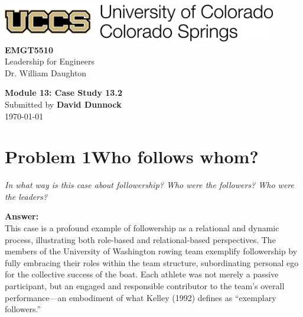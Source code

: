 \documentclass[12pt]{article}
\newenvironment{problem}{\color{dodblue}\itshape}{\par}
\begin{document}
\begin{center}
    \includegraphics[width=0.9\textwidth,keepaspectratio]{assets/images/uccs-logo.png}\\[8\baselineskip]

    {\HeadingFont\fontsize{24}{26}\selectfont\textbf{EMGT5510}}\\[0.25\baselineskip]
    {\large Leadership for Engineers}\\[0.15\baselineskip]
    {\small Dr. William Daughton}\\[2\baselineskip]
\vfill

    {\HeadingFont\fontsize{20}{22}\selectfont\textbf{Module 13: Case Study 13.2}}\\[0.5\baselineskip]
    {Submitted by \textbf{David Dunnock}}\\[0.15\baselineskip]
    {\today}
\end{center}

\newpage

\section*{Problem 1\textemdash{}Who follows whom?}
\begin{problem}
In what way is this case about followership? Who were the followers? Who were the leaders?
\end{problem}

\textbf{Answer:}\\
This case is a profound example of followership as a relational and dynamic process, illustrating both role-based and relational-based perspectives. The members of the University of Washington rowing team exemplify followership by fully embracing their roles within the team structure, subordinating personal ego for the collective success of the boat. Each athlete was not merely a passive participant, but an engaged and responsible contributor to the team’s overall performance—an embodiment of what Kelley (1992) defines as “exemplary followers.”
\end{document}

